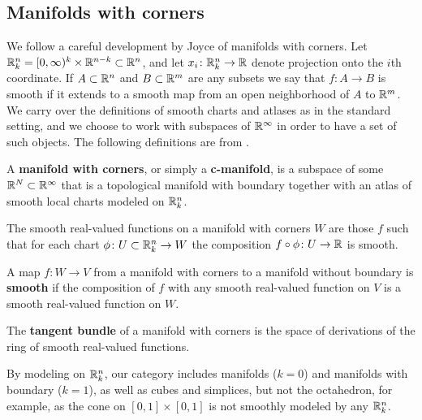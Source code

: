 \subsection{Manifolds with corners}

We follow a careful development by Joyce \cite{Joy12} of manifolds with corners.
Let $\mathbb{R}^n_k = [0,\infty)^k \times \mathbb{R}^{n-k} \subset \mathbb{R}^n$, and let $x_i \colon \mathbb{R}^n_k \to \mathbb{R}$ denote projection onto the $i$th coordinate.
If $A\subset \mathbb{R}^n$ and $B\subset \mathbb{R}^m$ are any subsets we say that $f \colon A \to B$ is smooth if it extends to a smooth map from an open neighborhood of $A$ to $\mathbb{R}^m$.
We carry over the definitions of smooth charts and atlases as in the standard setting, and we choose to work with subspaces of $\mathbb{R}^\infty$ in order to have a set of such objects.
The following definitions are from \cite[Section 2]{Joy12}.

\begin{definition}
	A {\bf manifold with corners}, or simply a \textbf{c-manifold}, is a subspace of some $\mathbb{R}^N \subset \mathbb{R}^\infty$ that is a topological manifold with boundary together with an atlas of smooth local charts modeled on $\mathbb{R}^n_k$.

	The smooth real-valued functions on a manifold with corners $W$ are those $f$ such that for each chart $\phi \colon U \subset \mathbb{R}^n_k \to W$ the composition $f \circ \phi \colon U \to \mathbb{R}$ is smooth.

	A map $f \colon W \to V$ from a manifold with corners to a manifold without boundary
	is {\bf smooth} if the composition of $f$ with any smooth real-valued function on $V$ is
	a smooth real-valued function on $W$.

	The {\bf tangent bundle} of a manifold with corners is the space of derivations of the ring of smooth real-valued functions.
\end{definition}

By modeling on $\mathbb{R}^n_k$, our category includes manifolds ($k=0$) and manifolds with boundary ($k=1$), as well as cubes and simplices, but not the octahedron, for example, as the cone on $[0,1] \times [0,1]$ is not smoothly modeled by any $\mathbb{R}^n_k$.

